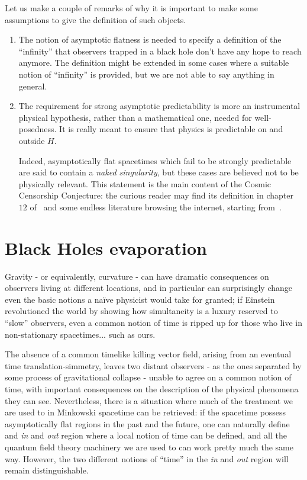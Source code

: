 \begin{remark}
	Let us make a couple of remarks of why it is important to make some assumptions to give the definition of such objects.
	\begin{enumerate}[label=(\Roman*)]
		\item The notion of asymptotic flatness is needed to specify a definition of the ``infinity'' that observers trapped in a black hole don't have any hope to reach anymore. The definition might be extended in some cases where a suitable notion of ``infinity'' is provided, but we are not able to say anything in general.
		\item The requirement for strong asymptotic predictability is more an instrumental physical hypothesis, rather than a mathematical one, needed for well-posedness. It is really meant to ensure that physics is predictable on and outside \(H\).
		
		Indeed, asymptotically flat spacetimes which fail to be strongly predictable are said to contain a \emph{naked singularity}, but these cases are believed not to be physically relevant. This statement is the main content of the Cosmic Censorship Conjecture: the curious reader may find its definition in chapter \(12\) of~\cite{wald2010general} and some endless literature browsing the internet, starting from~\cite{dias2018strong}.
	\end{enumerate}
\end{remark}


\section{Black Holes evaporation}
\label{sec:black-holes-evaporation}
Gravity - or equivalently, curvature - can have dramatic consequences on observers living at different locations, and in particular can surprisingly change even the basic notions a na\"ive physicist would take for granted; if Einstein revolutioned the world by showing how simultaneity is a luxury reserved to ``slow'' observers, even a common notion of time is ripped up for those who live in non-stationary spacetimes... such as ours.

\noindent
The absence of a common timelike killing vector field, arising from an eventual time translation-simmetry, leaves two distant observers - as the ones separated by some process of gravitational collapse - unable to agree on a common notion of time, with important consequences on the description of the physical phenomena they can see.
Nevertheless, there is a situation where much of the treatment we are used to in Minkowski spacetime can be retrieved: if the spacetime possess asymptotically flat regions in the past and the future, one can naturally define and \emph{in} and \emph{out} region where a local notion of time can be defined, and all the quantum field theory machinery we are used to can work pretty much the same way.
However, the two different notions of ``time'' in the \emph{in} and \emph{out} region will remain distinguishable.

